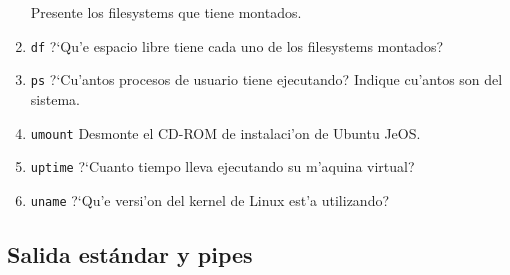 \begin{enumerate}

Presente los filesystems que tiene montados.

\item \texttt{df} ?`Qu'e espacio libre tiene cada uno de los filesystems montados?

\item \texttt{ps} ?`Cu'antos procesos de usuario tiene ejecutando? Indique cu'antos son del sistema.

\item \texttt{umount} Desmonte el CD-ROM de instalaci'on de Ubuntu JeOS.

\item \texttt{uptime} ?`Cuanto tiempo lleva ejecutando su m'aquina virtual?

\item \texttt{uname} ?`Qu'e versi'on del kernel de Linux est'a utilizando?

\end{enumerate}

\subsection{Salida est\'andar y pipes}

